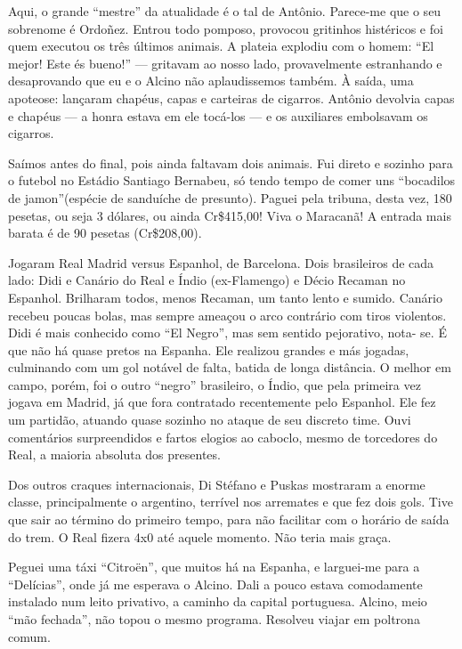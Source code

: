 Aqui, o grande ``mestre'' da atualidade é o tal de Antônio. Parece-me que o seu sobrenome é Ordoñez. Entrou todo pomposo, provocou gritinhos histéricos e foi quem executou os três últimos animais. A plateia explodiu com o homem: ``El mejor! Este és bueno!'' --- gritavam ao nosso lado, provavelmente estranhando e desaprovando que eu e o Alcino não aplaudissemos também. À saída, uma apoteose: lançaram chapéus, capas e carteiras de cigarros. Antônio devolvia capas e chapéus --- a honra estava em ele tocá-los --- e os auxiliares embolsavam os cigarros.

Saímos antes do final, pois ainda faltavam dois animais. Fui direto e sozinho para o futebol no Estádio Santiago Bernabeu, só tendo tempo de comer uns ``bocadilos de jamon''(espécie de sanduíche de presunto). Paguei pela tribuna, desta vez, 180 pesetas, ou seja 3 dólares, ou ainda Cr\$415,00! Viva o Maracanã! A entrada mais barata é de 90 pesetas (Cr\$208,00).

Jogaram Real Madrid versus Espanhol, de Barcelona. Dois brasileiros de cada lado: Didi e Canário do Real e Índio (ex-Flamengo) e Décio Recaman no Espanhol. Brilharam todos, menos Recaman, um tanto lento e sumido. Canário recebeu poucas bolas, mas sempre ameaçou o arco contrário com tiros violentos. Didi é mais conhecido como ``El Negro'', mas sem sentido pejorativo, nota- se. É que não há quase pretos na Espanha. Ele realizou grandes e más jogadas, culminando com um gol notável de falta, batida de longa distância. O melhor em campo, porém, foi o outro ``negro'' brasileiro, o Índio, que pela primeira vez jogava em Madrid, já que fora contratado recentemente pelo Espanhol. Ele fez um partidão, atuando quase sozinho no ataque de seu discreto time. Ouvi comentários surpreendidos e fartos elogios ao caboclo, mesmo de torcedores do Real, a maioria absoluta dos presentes.

Dos outros craques internacionais, Di Stéfano e Puskas mostraram a enorme classe, principalmente o argentino, terrível nos arremates e que fez dois gols. Tive que sair ao término do primeiro tempo, para não facilitar com o horário de saída do trem. O Real fizera 4x0 até aquele momento. Não teria mais graça.

Peguei uma táxi ``Citroën'', que muitos há na Espanha, e larguei-me para a ``Delícias'', onde já me esperava o Alcino. Dali a pouco estava comodamente instalado num leito privativo, a caminho da capital portuguesa. Alcino, meio ``mão fechada'', não topou o mesmo programa. Resolveu viajar em poltrona comum.

